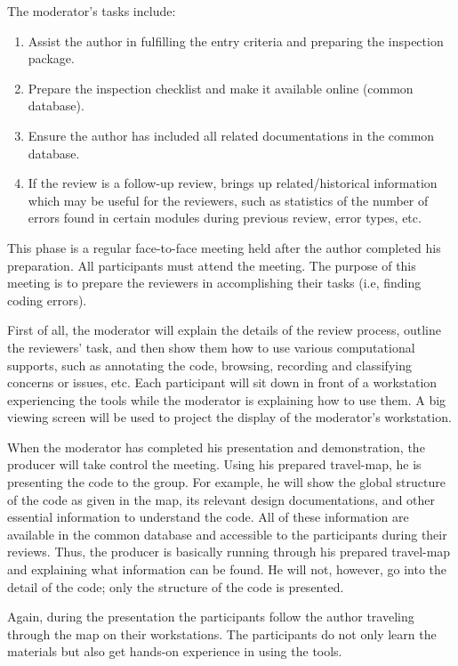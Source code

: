 The moderator's tasks include:
\begin {enumerate}
\item Assist the author in fulfilling the entry criteria and preparing
the inspection package.
\item Prepare the inspection checklist and make it available online
(common database).
\item Ensure the author has included all related documentations in
the common database.
\item If the review is a follow-up review,
brings up related/historical information which may be useful for the 
reviewers, 
such as statistics of the number of errors found in certain modules
during previous review, error types, etc.
\end {enumerate}



This phase is a regular face-to-face meeting  held  after the 
author completed his preparation. All participants must attend the meeting.
The purpose of this meeting is to prepare the reviewers in
accomplishing  their tasks (i.e, finding coding errors).

First of all, the moderator will explain the details of the
review process, outline the reviewers' task, and then
show them  how to use various computational
supports, such as annotating the code,
browsing, recording and classifying concerns or issues, etc.
Each participant will sit down in front of a workstation experiencing
the tools while the moderator is explaining how to use them.
A  big viewing screen will be used to 
project the display of the moderator's workstation.

When the moderator has completed his presentation and demonstration,
the producer will take control the meeting.
Using his prepared travel-map, he is presenting the code to
the group.  For example, he will show the global structure of
the code as given in the map, its relevant design documentations,
and other essential information to understand the code. 
All of these information are available in the common database and 
accessible to the participants during their reviews.
Thus, the producer is basically running through his
prepared travel-map and explaining what information can be found.
He will not, however, go into the detail of the code;
only the structure of the code is presented.

Again, during
the presentation the participants follow the author traveling
through the map on their workstations.  The participants do not
only learn the materials but also get hands-on experience in
using the tools.


